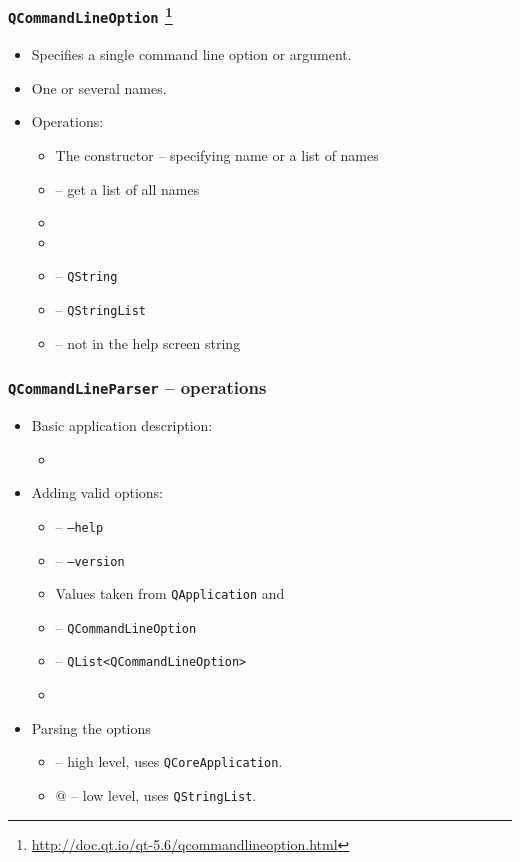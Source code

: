 \begin{frame}[fragile]
  \frametitle{\texttt{QCommandLineOption}
    \footnote{\url{http://doc.qt.io/qt-5.6/qcommandlineoption.html}}}
  \begin{itemize}
    \item Specifies a single command line option or argument.
    \item One or several names.
    \item Operations:
    \begin{itemize}
      \item The constructor -- specifying name or a list of names
      \item \verb@names@ -- get a list of all names
      \item \verb@setDescription@
      \item \verb@setValueName@
      \item \verb@setDefaultValue@ -- \texttt{QString}
      \item \verb@setDefaultValues@ -- \texttt{QStringList}
      \item \verb@setHidden@ -- not in the help screen string
    \end{itemize}
  \end{itemize}
\end{frame}

\begin{frame}[fragile]
  \frametitle{\texttt{QCommandLineParser} -- operations}
  \small
  \begin{itemize}
    \item Basic application description:
    \begin{itemize}
      \item \verb@setApplicationDescription@
    \end{itemize}
    \item Adding valid options:
    \begin{itemize}
      \item \verb@addHelpOption@ -- \texttt{--help}
      \item \verb@addVersionOption@ -- \texttt{--version}
      \item Values taken from \texttt{QApplication} and \verb@applicationDescription@
      \item \verb@addOption@ -- \texttt{QCommandLineOption}
      \item \verb@addOptions@ -- \texttt{QList<QCommandLineOption>}
      \item \verb@addPositionalArgument@
    \end{itemize}
    \item Parsing the options
    \begin{itemize}
      \item \verb@process@ -- high level, uses \texttt{QCoreApplication}.
      \item \verb@parse @ -- low level, uses \texttt{QStringList}.
    \end{itemize}
  \end{itemize}
\end{frame}

